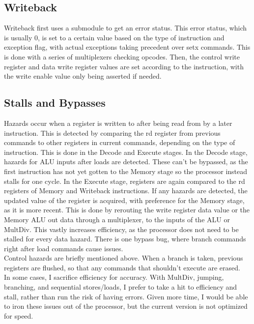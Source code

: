 \documentclass[letterpaper]{article} %
\begin{document}
\subsection*{Writeback}
Writeback first uses a submodule to get an error status. This error status, which is usually 0, is set to a certain value based on the type of instruction and exception flag, with actual exceptions taking precedent over setx commands. This is done with a series of multiplexers checking opcodes. Then, the control write register and data write register values are set according to the instruction, with the write enable value only being asserted if needed. \\

\subsection*{Stalls and Bypasses}
Hazards occur when a register is written to after being read from by a later instruction. This is detected by comparing the rd register from previous commands to other registers in current commands, depending on the type of instruction. This is done in the Decode and Execute stages. In the Decode stage, hazards for ALU inputs after loads are detected. These can't be bypassed, as the first instruction has not yet gotten to the Memory stage so the processor instead stalls for one cycle. In the Execute stage, registers are again compared to the rd registers of Memory and Writeback instructions. If any hazards are detected, the updated value of the register is acquired, with preference for the Memory stage, as it is more recent. This is done by rerouting the write register data value or the Memory ALU out data through a multiplexer, to the inputs of the ALU or MultDiv. This vastly increases efficiency, as the processor does not need to be stalled for every data hazard. There is one bypass bug, where branch commands right after load commands cause issues.  \\
Control hazards are briefly mentioned above. When a branch is taken, previous registers are flushed, so that any commands that shouldn't execute are erased. \\
In some cases, I sacrifice efficiency for accuracy. With MultDiv, jumping, branching, and sequential stores/loads, I prefer to take a hit to efficiency and stall, rather than run the risk of having errors. Given more time, I would be able to iron these issues out of the processor, but the current version is not optimized for speed. \\
\end{document}
